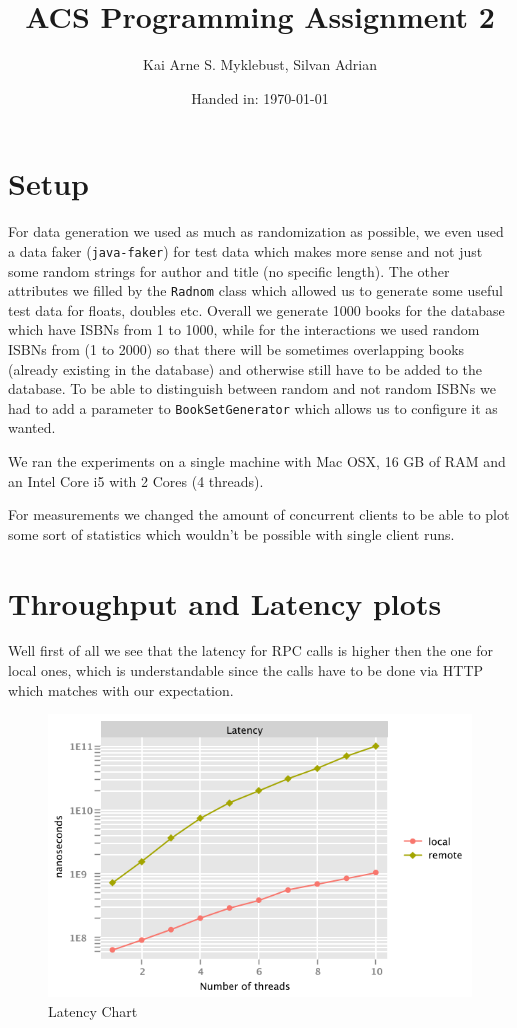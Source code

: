 \documentclass[12pt,a4paper]{article}
\begin{document}
\title{ACS Programming Assignment 2}
\subtitle{}

\author{Kai Arne S. Myklebust, Silvan Adrian}
\date{Handed in: \today}
	
\maketitle
\tableofcontents

\section{Setup}
For data generation we used as much as randomization as possible, we even used a data faker (\texttt{java-faker}) for test data which makes more sense and not just some random strings for author and title (no specific length).
The other attributes we filled by the \texttt{Radnom} class which allowed us to generate some useful test data for floats, doubles etc.
Overall we generate 1000 books for the database which have ISBNs from 1 to 1000, while for the interactions we used random ISBNs from (1 to 2000) so that there will be sometimes overlapping books (already existing in the database) and otherwise still have to be added to the database.
To be able to distinguish between random and not random ISBNs we had to add a parameter to \texttt{BookSetGenerator} which allows us to configure it as wanted.

We ran the experiments on a single machine with Mac OSX, 16 GB of RAM and an Intel Core i5 with 2 Cores (4 threads).

For measurements we changed the amount of concurrent clients to be able to plot some sort of statistics which wouldn't be possible with single client runs.

\section{Throughput and Latency plots}

Well first of all we see that the latency for RPC calls is higher then the one for local ones, which is understandable since the calls have to be done via HTTP which matches with our expectation.
\begin{figure}[htb!]
	\includegraphics[width=\textwidth]{latency_chart}
	\caption{Latency Chart}
\end{figure}
\end{document}

